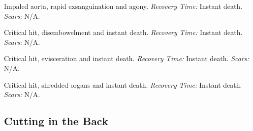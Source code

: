 \documentclass[12pt]{book}
\begin{document}
\begin{description}[labelwidth=1.5em, leftmargin=*, itemsep=0.4em]
    \item[17 -] Impaled aorta, rapid exsanguination and agony. \textit{Recovery Time:} Instant death. \textit{Scars:} N/A.
    \item[18 -] Critical hit, disembowelment and instant death. \textit{Recovery Time:} Instant death. \textit{Scars:} N/A.
    \item[19 -] Critical hit, evisceration and instant death. \textit{Recovery Time:} Instant death. \textit{Scars:} N/A.
    \item[20 -] Critical hit, shredded organs and instant death. \textit{Recovery Time:} Instant death. \textit{Scars:} N/A.
\end{description}

\subsection{Cutting in the Back}
\end{document}
